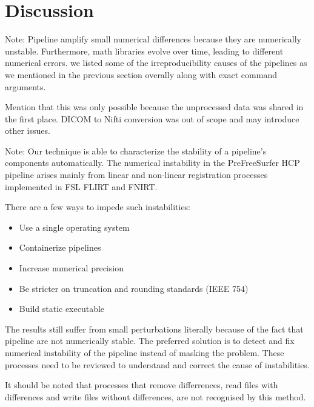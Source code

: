 \documentclass[a4paper,num-refs]{oup-contemporary}
\newcommand{\note}[2]{\color{blue}Note: #1\color{black}}
\begin{document}
\section{Discussion}

\note{Pipeline amplify small numerical differences because they are numerically 
unstable. Furthermore, math libraries evolve over time, leading to 
different numerical errors. we listed some of the irreproducibility 
causes of the pipelines as we mentioned in the previous section 
overally along with exact command arguments.

Mention that this was only possible because the unprocessed data was 
shared in the first place. DICOM to Nifti conversion was out of scope 
and may introduce other issues.}

\section{Conclusion}

\note{Our technique is able to characterize the stability of a pipeline's 
components automatically. The numerical instability in the 
PreFreeSurfer HCP pipeline arises mainly from linear and non-linear 
registration processes implemented in FSL FLIRT and FNIRT. 

There are a few ways to impede such instabilities:
\begin{itemize}
\item Use a single operating system
\item Containerize pipelines
\item Increase numerical precision
\item Be stricter on truncation and rounding standards (IEEE 754)
\item Build static executable
\end{itemize}

The results still suffer from small perturbations literally because of 
the fact that pipeline are not numerically stable. The preferred 
solution is to detect and fix numerical instability of the pipeline 
instead of masking the problem. These processes need to be reviewed to 
understand and correct the cause of instabilities. 

It should be noted that processes that remove differrences, read files with differences and 
write files without differences, are not recognised 
by this method.
}


\section{Acknowledgments}
\end{document}
